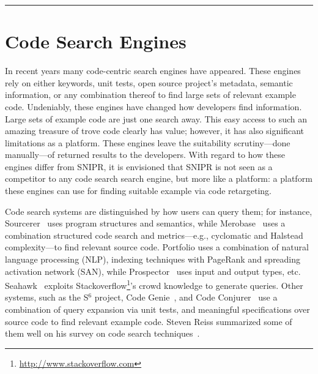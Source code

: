 \fancybreak{\pfbreakdisplay}

\section{Code Search Engines}
\label{sec:searchengines}

In recent years many code-centric search engines have appeared. These engines rely on either keywords, unit tests, open source project's metadata, semantic information, or any combination thereof to find large sets of relevant example code. Undeniably, these engines have changed how developers find information. Large sets of example code are just one search away. This easy access to such an amazing treasure of trove code clearly has value; however, it has also significant limitations as a platform. These engines leave the suitability scrutiny---done manually---of returned results to the developers. With regard to how these engines differ from \uppercase{SnipR}, it is envisioned that \uppercase{SnipR} is not seen as a competitor to any code search search engine, but more like a platform: a platform these engines can use for finding suitable example via code retargeting.

Code search systems are distinguished by how users can query them; for instance, Sourcerer~\cite{Bajracharya:2006vn, Bajracharya:2010um} uses program structures and semantics, while 
Merobase~\cite{Hummel:eq} uses a combination structured code search and metrics---e.g., cyclomatic and Halstead complexity---to find relevant source code. Portfolio\cite{McMillan:2011cm, McMillan:2011wq} uses a combination of natural language processing (NLP), indexing techniques with PageRank and spreading activation network (SAN), while Prospector~\cite{Mandelin:2005uj} uses 
input and output types, etc. Seahawk~\cite{Bacchelli:2012dl} exploits Stackoverflow\footnote{\url{http://www.stackoverflow.com}}'s crowd knowledge to generate queries. Other systems, such as the S$^{6}$ project\cite{Reiss:2009fu}, Code Genie~\cite{LazzariniLemos:2007jh}, and Code Conjurer~\cite{Hummel:eq} use a combination of query expansion via unit tests, and meaningful specifications over source code to find relevant example code. Steven Reiss summarized some of them well on his survey on code search techniques~\cite{Reiss:2009fu}.
 
